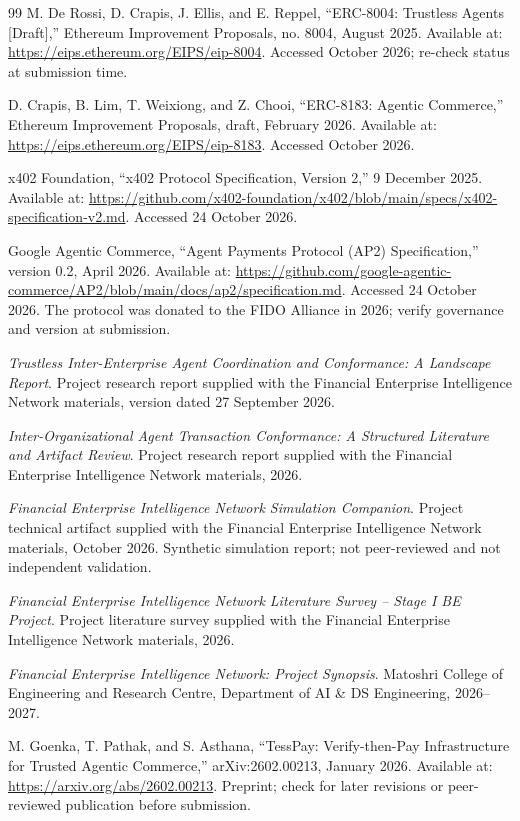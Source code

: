\documentclass[12pt,a4paper,oneside]{report}
\begin{document}
\begin{thebibliography}{99}
M. De Rossi, D. Crapis, J. Ellis, and E. Reppel,
``ERC-8004: Trustless Agents [Draft],'' Ethereum Improvement Proposals, no. 8004,
August 2025. Available at: \url{https://eips.ethereum.org/EIPS/eip-8004}.
Accessed October 2026; re-check status at submission time.

D. Crapis, B. Lim, T. Weixiong, and Z. Chooi,
``ERC-8183: Agentic Commerce,'' Ethereum Improvement Proposals, draft, February 2026.
Available at: \url{https://eips.ethereum.org/EIPS/eip-8183}. Accessed October 2026.

x402 Foundation, ``x402 Protocol Specification, Version 2,'' 9 December 2025.
Available at: \url{https://github.com/x402-foundation/x402/blob/main/specs/x402-specification-v2.md}.
Accessed 24 October 2026.

Google Agentic Commerce, ``Agent Payments Protocol (AP2) Specification,'' version 0.2,
April 2026. Available at: \url{https://github.com/google-agentic-commerce/AP2/blob/main/docs/ap2/specification.md}.
Accessed 24 October 2026. The protocol was donated to the FIDO Alliance in 2026; verify governance and version at submission.

\emph{Trustless Inter-Enterprise Agent Coordination and Conformance: A Landscape Report}.
Project research report supplied with the Financial Enterprise Intelligence Network materials, version dated 27 September 2026.

\emph{Inter-Organizational Agent Transaction Conformance: A Structured Literature and Artifact Review}.
Project research report supplied with the Financial Enterprise Intelligence Network materials, 2026.

\emph{Financial Enterprise Intelligence Network Simulation Companion}. Project technical artifact supplied with the Financial Enterprise Intelligence Network materials, October 2026. Synthetic simulation report; not peer-reviewed and not independent validation.

\emph{Financial Enterprise Intelligence Network Literature Survey -- Stage I BE Project}.
Project literature survey supplied with the Financial Enterprise Intelligence Network materials, 2026.

\emph{Financial Enterprise Intelligence Network: Project Synopsis}.
Matoshri College of Engineering and Research Centre, Department of AI \& DS Engineering, 2026--2027.

M. Goenka, T. Pathak, and S. Asthana,
``TessPay: Verify-then-Pay Infrastructure for Trusted Agentic Commerce,''
arXiv:2602.00213, January 2026. Available at: \url{https://arxiv.org/abs/2602.00213}.
Preprint; check for later revisions or peer-reviewed publication before submission.

\end{thebibliography}
\end{document}
